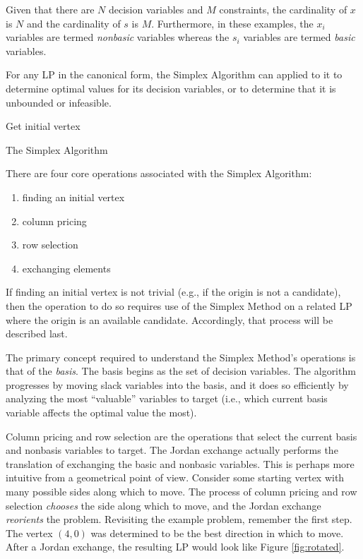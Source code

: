 Given that there are $N$ decision variables and $M$ constraints, the cardinality
of $x$ is $N$ and the cardinality of $s$ is $M$. Furthermore, in these examples,
the $x_i$ variables are termed \textit{nonbasic} variables whereas the $s_i$
variables are termed \textit{basic} variables.

For any LP in the canonical form, the Simplex Algorithm can applied to it to
determine optimal values for its decision variables, or to determine that it is
unbounded or infeasible.

\begin{algorithm}[H]
 \SetAlgoLined
 Get initial vertex\;
  \caption{The Simplex Algorithm}
\end{algorithm}

There are four core operations associated with the Simplex Algorithm:
\begin{enumerate}
  \item finding an initial vertex
  \item column pricing
  \item row selection
  \item exchanging elements
\end{enumerate}

If finding an initial vertex is not trivial (e.g., if the origin is not a
candidate), then the operation to do so requires use of the Simplex Method on a
related LP where the origin is an available candidate. Accordingly, that process
will be described last.

The primary concept required to understand the Simplex Method's operations is
that of the \textit{basis}. The basis begins as the set of decision
variables. The algorithm progresses by moving slack variables into the basis,
and it does so efficiently by analyzing the most ``valuable'' variables to
target (i.e., which current basis variable affects the optimal value the most).

Column pricing and row selection are the operations that select the current
basis and nonbasis variables to target. The Jordan exchange actually performs
the translation of exchanging the basic and nonbasic variables. This is perhaps
more intuitive from a geometrical point of view. Consider some starting vertex
with many possible sides along which to move. The process of column pricing and
row selection \textit{chooses} the side along which to move, and the Jordan
exchange \textit{reorients} the problem. Revisiting the example problem,
remember the first step. The vertex $(4, 0)$ was determined to be the best
direction in which to move. After a Jordan exchange, the resulting LP would look
like Figure \ref{fig:rotated}.


